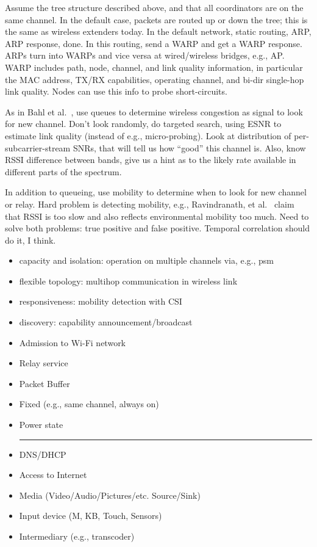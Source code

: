 Assume the tree structure described above, and that all coordinators are on the same channel. In the default case, packets are routed up or down the tree; this is the same as wireless extenders today. In the default network, static routing, ARP, ARP response, done. In this routing, send a WARP and get a WARP response. ARPs turn into WARPs and vice versa at wired/wireless bridges, e.g., AP. WARP includes path, node, channel, and link quality information, in particular the MAC address, TX/RX capabilities, operating channel, and bi-dir single-hop link quality. Nodes can use this info to probe short-circuits.

As in Bahl et al.~\cite{bahl_repeater}, use queues to determine wireless congestion as signal to look for new channel. Don't look randomly, do targeted search, using ESNR to estimate link quality (instead of e.g., micro-probing). Look at distribution of per-subcarrier-stream SNRs, that will tell us how ``good'' this channel is. Also, know RSSI difference between bands, give us a hint as to the likely rate available in different parts of the spectrum. 

In addition to queueing, use mobility to determine when to look for new channel or relay. Hard problem is detecting mobility, e.g., Ravindranath, et al.~\cite{ravindranath_sensorhints} claim that RSSI is too slow and also reflects environmental mobility too much. Need to solve both problems: true positive and false positive. Temporal correlation should do it, I think.

\begin{itemize}
\item capacity and isolation: operation on multiple channels via, e.g., psm
\item flexible topology: multihop communication in wireless link
\item responsiveness: mobility detection with CSI
\item discovery: capability announcement/broadcast
\end{itemize}

\begin{itemize}
\item Admission to Wi-Fi network
\item Relay service
\item Packet Buffer
\item Fixed (e.g., same channel, always on)
\item Power state\\
\hrule
\item DNS/DHCP
\item Access to Internet
\item Media (Video/Audio/Pictures/etc. Source/Sink)
\item Input device (M, KB, Touch, Sensors)
\item Intermediary (e.g., transcoder)
\end{itemize}

